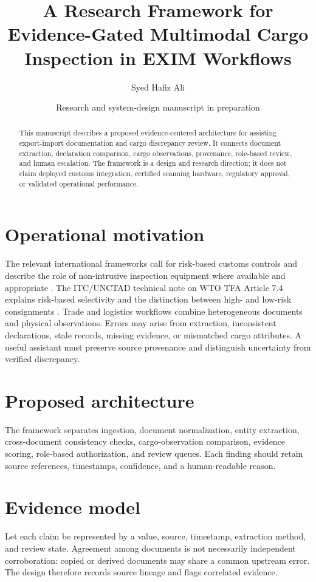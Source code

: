 \documentclass[11pt]{article}
\title{A Research Framework for Evidence-Gated Multimodal Cargo Inspection in EXIM Workflows}
\author{Syed Hafiz Ali}
\date{Research and system-design manuscript in preparation}
\begin{document}
\maketitle
\begin{abstract}
This manuscript describes a proposed evidence-centered architecture for assisting export-import documentation and cargo discrepancy review. It connects document extraction, declaration comparison, cargo observations, provenance, role-based review, and human escalation. The framework is a design and research direction; it does not claim deployed customs integration, certified scanning hardware, regulatory approval, or validated operational performance.
\end{abstract}
\section{Operational motivation}
The relevant international frameworks call for risk-based customs controls and describe the role of non-intrusive inspection equipment where available and appropriate \cite{wto2014tfa,wco2025safe,wco2025nii}. The ITC/UNCTAD technical note on WTO TFA Article 7.4 explains risk-based selectivity and the distinction between high- and low-risk consignments \cite{unctad2021risk}.
Trade and logistics workflows combine heterogeneous documents and physical observations. Errors may arise from extraction, inconsistent declarations, stale records, missing evidence, or mismatched cargo attributes. A useful assistant must preserve source provenance and distinguish uncertainty from verified discrepancy.
\section{Proposed architecture}
The framework separates ingestion, document normalization, entity extraction, cross-document consistency checks, cargo-observation comparison, evidence scoring, role-based authorization, and review queues. Each finding should retain source references, timestamps, confidence, and a human-readable reason.
\section{Evidence model}
Let each claim be represented by a value, source, timestamp, extraction method, and review state. Agreement among documents is not necessarily independent corroboration: copied or derived documents may share a common upstream error. The design therefore records source lineage and flags correlated evidence.
\end{document}
